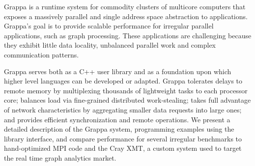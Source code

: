 Grappa is a runtime system for commodity clusters of multicore computers that
exposes a massively parallel and single address space abstraction to
applications. Grappa's goal is to provide scalable performance for irregular
parallel applications, such as graph processing. These applications are
challenging because they exhibit little data locality, unbalanced parallel
work and complex communication patterns.

Grappa serves both as a C++ user library and as a foundation upon which higher
level languages can be developed or adapted. Grappa tolerates delays to remote
memory by multiplexing thousands of lightweight tasks to each processor core;
balances load via fine-grained distributed work-stealing; takes full advantage
of network characteristics by aggregating smaller data requests into large
ones; and provides efficient synchronization and remote operations. We present
a detailed description of the Grappa system, programming examples using the
library interface, and compare performance for several irregular benchmarks to
hand-optimized MPI code and the Cray XMT, a custom system used to target the
real time graph analytics market.